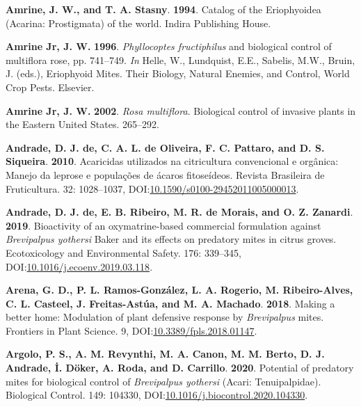 \documentclass[12pt,final,CPage]{ufthesis}
\newlength{\cslhangindent}
\newenvironment{CSLReferences}[2] %
{%
	\setlength{\parindent}{0pt}
	\ifodd #1 \everypar{\setlength{\hangindent}{\cslhangindent}}\ignorespaces\fi
	\ifnum #2 > 0
	\setlength{\parskip}{#2\baselineskip}
	\fi
}%
{}
\begin{document}
{\begin{CSLReferences}{1}{0}
  \leavevmode{}%
  \textbf{Amrine, J. W., and T. A. Stasny}. \textbf{1994}. Catalog of the {Eriophyoidea} ({Acarina}: {Prostigmata}) of the world. Indira Publishing House.

  \leavevmode{}%
  \textbf{Amrine Jr, J. W.} \textbf{1996}. {\emph{Phyllocoptes fructiphilus}} and biological control of multiflora rose, pp. 741--749. \emph{In} Helle, W., Lundquist, E.E., Sabelis, M.W., Bruin, J. (eds.), Eriophyoid Mites. Their Biology, Natural Enemies, and Control, World Crop Pests. Elsevier.

  \leavevmode{}%
  \textbf{Amrine Jr, J. W.} \textbf{2002}. {\emph{Rosa multiflora}}. Biological control of invasive plants in the Eastern {United States}. 265--292.

  \leavevmode{}%
  \textbf{Andrade, D. J. de, C. A. L. de Oliveira, F. C. Pattaro, and D. S. Siqueira}. \textbf{2010}. Acaricidas utilizados na citricultura convencional e org{â}nica: Manejo da leprose e popula{ç}{õ}es de {á}caros fitose{í}deos. Revista Brasileira de Fruticultura. 32: 1028--1037, DOI:\href{https://doi.org/10.1590/s0100-29452011005000013}{10.1590/s0100-29452011005000013}.

  \leavevmode{}%
  \textbf{Andrade, D. J. de, E. B. Ribeiro, M. R. de Morais, and O. Z. Zanardi}. \textbf{2019}. Bioactivity of an oxymatrine-based commercial formulation against {\emph{Brevipalpus yothersi}} {Baker} and its effects on predatory mites in citrus groves. Ecotoxicology and Environmental Safety. 176: 339--345, DOI:\href{https://doi.org/10.1016/j.ecoenv.2019.03.118}{10.1016/j.ecoenv.2019.03.118}.

  \leavevmode{}%
  \textbf{Arena, G. D., P. L. Ramos-González, L. A. Rogerio, M. Ribeiro-Alves, C. L. Casteel, J. Freitas-Astúa, and M. A. Machado}. \textbf{2018}. Making a better home: Modulation of plant defensive response by {\emph{Brevipalpus}} mites. Frontiers in Plant Science. 9, DOI:\href{https://doi.org/10.3389/fpls.2018.01147}{10.3389/fpls.2018.01147}.

  \leavevmode{}%
  \textbf{Argolo, P. S., A. M. Revynthi, M. A. Canon, M. M. Berto, D. J. Andrade, İ. Döker, A. Roda, and D. Carrillo}. \textbf{2020}. Potential of predatory mites for biological control of {\emph{Brevipalpus yothersi}} ({Acari}: {Tenuipalpidae}). Biological Control. 149: 104330, DOI:\href{https://doi.org/10.1016/j.biocontrol.2020.104330}{10.1016/j.biocontrol.2020.104330}.


\end{CSLReferences}}
\end{document}
